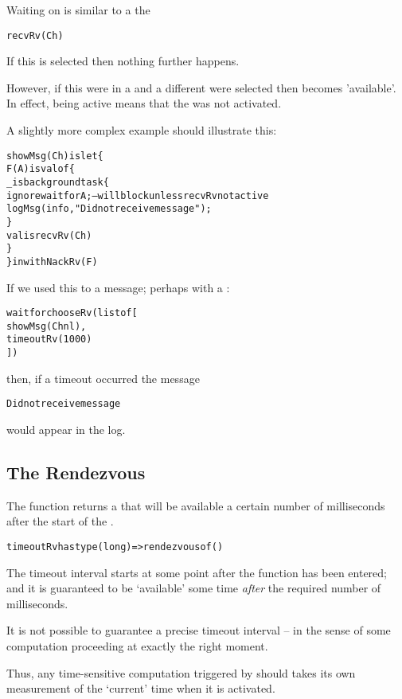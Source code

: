Waiting on  is similar to a  the 
\begin{alltt}
recvRv(Ch)
\end{alltt}

If this  is selected then nothing further happens.

However, if this  were in a  and a different  were selected then  becomes 'available'. In effect,  being active means that the  was not activated.

A slightly more complex example should illustrate this:
\begin{alltt}
showMsg(Ch) is let\{
  F(A) is valof\{
    _ is background task \{
      ignore wait for A; -- will block unless recvRv not active
      logMsg(info,"Did not receive message");
    \}
    valis recvRv(Ch)
  \}
\} in withNackRv(F)
\end{alltt}
If we used this to  a message; perhaps with a :
\begin{alltt}
wait for chooseRv(list of [
  showMsg(Chnl),
  timeoutRv(1000)
])
\end{alltt}
then, if a timeout occurred the message
\begin{alltt}
Did not receive message
\end{alltt}
would appear in the log.

\subsection{The  Rendezvous}
\label{timeoutRvFun}

The  function returns a  that will be available a certain number of milliseconds after the start of the .
\begin{alltt}
timeoutRv has type (long)=>rendezvous of ()
\end{alltt}
The timeout interval starts at some point after the  function has been entered; and it is guaranteed to be `available' some time \emph{after} the required number of milliseconds.
\begin{aside}
It is not possible to guarantee a precise timeout interval -- in the sense of some computation proceeding at exactly the right moment.

Thus, any time-sensitive computation triggered by  should takes its own measurement of the `current' time when it is activated.
\end{aside}

